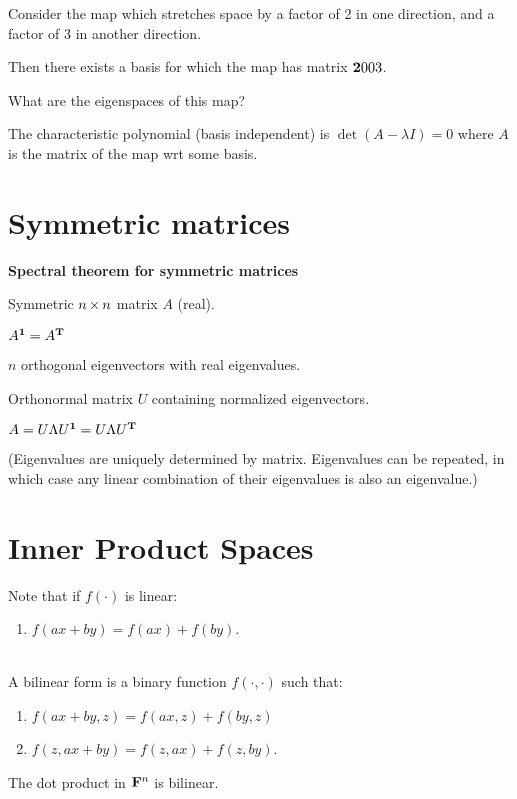 \newpage
Consider the map which stretches space by a factor of 2 in one direction, and a
factor of 3 in another direction.

Then there exists a basis for which the map has matrix
$
\mathbf{2}{0}
    {0}{3}
$.

What are the eigenspaces of this map?

The characteristic polynomial (basis independent) is $\det(A - \lambda I) = 0$
where $A$ is the matrix of the map wrt some basis.

\newpage
\section{Symmetric matrices}

\textbf{Spectral theorem for symmetric matrices}

Symmetric $n \operatorname{\times} n$ matrix $A$ (real).

$A^{\mathbf 1} = A^{\mathbf{T}}$

$n$ orthogonal eigenvectors with real eigenvalues.

Orthonormal matrix $U$ containing normalized eigenvectors.

$A = U\Lambda U^{\mathbf 1} = U\Lambda U^{\mathbf{T}}$

(Eigenvalues are uniquely determined by matrix. Eigenvalues can be repeated, in which case any linear combination of their
eigenvalues is also an eigenvalue.)

\section{Inner Product Spaces}

Note that if $f(\cdot)$ is linear:
\begin{enumerate}
\item $f(ax + by) = f(ax) + f(by)$.
\end{enumerate}

\begin{definition*}~\\
  A bilinear form is a binary function $f(\cdot, \cdot)$ such that:
  \begin{enumerate}
  \item $f(ax + by, z) = f(ax, z) + f(by, z)$
  \item $f(z, ax + by) = f(z, ax) + f(z, by)$.
  \end{enumerate}
\end{definition*}


\begin{claim*}
  The dot product in $\mathbf{F}^n$ is bilinear.
\end{claim*}

